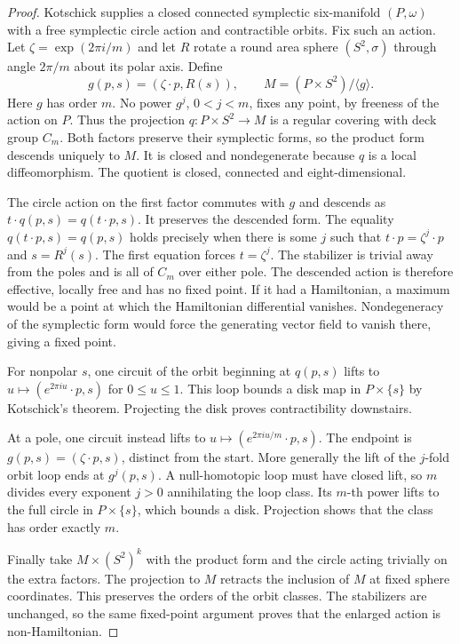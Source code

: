 \documentclass[11pt]{amsart}
\newcommand{\cyc}{C_m}
\begin{document}
\begin{proof}
Kotschick \cite[Theorem 2]{K} supplies a closed connected symplectic six-manifold \((P,\omega)\) with a free symplectic circle action and contractible orbits. Fix such an action. Let \(\zeta=\exp(2\pi i/m)\) and let \(R\) rotate a round area sphere \((S^2,\sigma)\) through angle \(2\pi/m\) about its polar axis. Define
\[
   g(p,s)=(\zeta\cdot p,R(s)),\qquad
   M=(P\times S^2)/\langle g\rangle .
\]
Here \(g\) has order \(m\). No power \(g^j\), \(0<j<m\), fixes any point, by freeness of the action on \(P\). Thus the projection \(q:P\times S^2\to M\) is a regular covering with deck group \(\cyc\). Both factors preserve their symplectic forms, so the product form descends uniquely to \(M\). It is closed and nondegenerate because \(q\) is a local diffeomorphism. The quotient is closed, connected and eight-dimensional.

The circle action on the first factor commutes with \(g\) and descends as \(t\cdot q(p,s)=q(t\cdot p,s)\). It preserves the descended form. The equality \(q(t\cdot p,s)=q(p,s)\) holds precisely when there is some \(j\) such that \(t\cdot p=\zeta^j\cdot p\) and \(s=R^j(s)\). The first equation forces \(t=\zeta^j\). The stabilizer is trivial away from the poles and is all of \(\cyc\) over either pole. The descended action is therefore effective, locally free and has no fixed point. If it had a Hamiltonian, a maximum would be a point at which the Hamiltonian differential vanishes. Nondegeneracy of the symplectic form would force the generating vector field to vanish there, giving a fixed point.

For nonpolar \(s\), one circuit of the orbit beginning at \(q(p,s)\) lifts to \(u\mapsto(e^{2\pi i u}\cdot p,s)\) for \(0\leq u\leq1\). This loop bounds a disk map in \(P\times\{s\}\) by Kotschick's theorem. Projecting the disk proves contractibility downstairs.

At a pole, one circuit instead lifts to \(u\mapsto(e^{2\pi i u/m}\cdot p,s)\). The endpoint is \(g(p,s)=(\zeta\cdot p,s)\), distinct from the start. More generally the lift of the \(j\)-fold orbit loop ends at \(g^j(p,s)\). A null-homotopic loop must have closed lift, so \(m\) divides every exponent \(j>0\) annihilating the loop class. Its \(m\)-th power lifts to the full circle in \(P\times\{s\}\), which bounds a disk. Projection shows that the class has order exactly \(m\).

Finally take \(M\times(S^2)^k\) with the product form and the circle acting trivially on the extra factors. The projection to \(M\) retracts the inclusion of \(M\) at fixed sphere coordinates. This preserves the orders of the orbit classes. The stabilizers are unchanged, so the same fixed-point argument proves that the enlarged action is non-Hamiltonian.
\end{proof}
\end{document}
